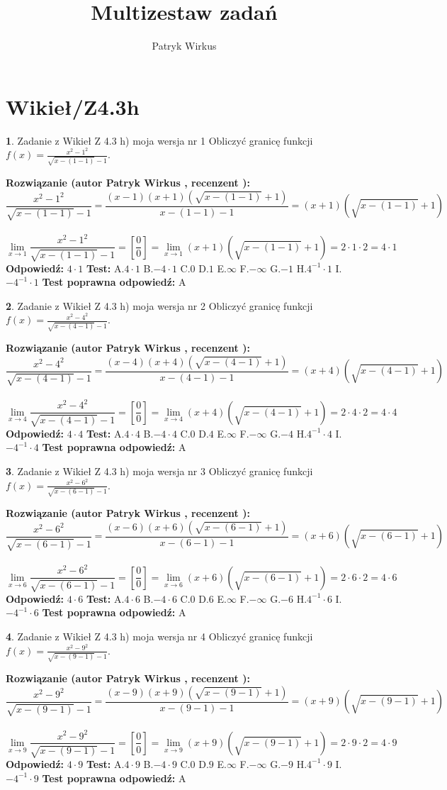 \documentclass[12pt, a4paper]{article}
\title{Multizestaw zadań}
\author{Patryk Wirkus}
\date{}
\theoremstyle{definition} %
\newtheorem{zad}{}
\newcommand{\kategoria}[1]{\section{#1}}
\newcommand{\zadStart}[1]{\begin{zad}#1\newline}
\newcommand{\zadStop}{\end{zad}}
\newcommand{\rozwStart}[2]{\noindent \textbf{Rozwiązanie (autor #1 , recenzent #2): }\newline}
\newcommand{\rozwStop}{\newline}
\newcommand{\odpStart}{\noindent \textbf{Odpowiedź:}\newline}
\newcommand{\odpStop}{\newline}
\newcommand{\testStart}{\noindent \textbf{Test:}\newline}
\newcommand{\testStop}{\newline}
\newcommand{\kluczStart}{\noindent \textbf{Test poprawna odpowiedź:}\newline}
\newcommand{\kluczStop}{\newline}
\begin{document}
\maketitle

\kategoria{Wikieł/Z4.3h}


\zadStart{Zadanie z Wikieł Z 4.3 h) moja wersja nr 1}
Obliczyć granicę funkcji $f(x)=\frac{x^{2} - 1^{2}}{\sqrt{x-(1-1)}-1}$.
\zadStop
\rozwStart{Patryk Wirkus}{}
$$\frac{x^{2} - 1^{2}}{\sqrt{x-(1-1)}-1}=\frac{(x-1)(x+1)(\sqrt{x-(1-1)}+1)}{x-(1-1)-1}=(x+1)(\sqrt{x-(1-1)}+1)$$
\\
$$\lim\limits_{x\to 1}\frac{x^{2} - 1^{2}}{\sqrt{x-(1-1)}-1}=[\frac{0}{0}]=
\lim\limits_{x\to 1}(x+1)(\sqrt{x-(1-1)}+1) = 2\cdot1 \cdot 2 = 4 \cdot 1$$
\rozwStop
\odpStart
$4\cdot1$
\odpStop
\testStart
A.$4\cdot1$
B.$-4\cdot1$
C.$0$
D.$1$
E.$\infty$
F.$-\infty$
G.$-1$
H.$4^{-1}\cdot1$
I.$-4^{-1}\cdot1$
\testStop
\kluczStart
A
\kluczStop



\zadStart{Zadanie z Wikieł Z 4.3 h) moja wersja nr 2}
Obliczyć granicę funkcji $f(x)=\frac{x^{2} - 4^{2}}{\sqrt{x-(4-1)}-1}$.
\zadStop
\rozwStart{Patryk Wirkus}{}
$$\frac{x^{2} - 4^{2}}{\sqrt{x-(4-1)}-1}=\frac{(x-4)(x+4)(\sqrt{x-(4-1)}+1)}{x-(4-1)-1}=(x+4)(\sqrt{x-(4-1)}+1)$$
\\
$$\lim\limits_{x\to 4}\frac{x^{2} - 4^{2}}{\sqrt{x-(4-1)}-1}=[\frac{0}{0}]=
\lim\limits_{x\to 4}(x+4)(\sqrt{x-(4-1)}+1) = 2\cdot4 \cdot 2 = 4 \cdot 4$$
\rozwStop
\odpStart
$4\cdot4$
\odpStop
\testStart
A.$4\cdot4$
B.$-4\cdot4$
C.$0$
D.$4$
E.$\infty$
F.$-\infty$
G.$-4$
H.$4^{-1}\cdot4$
I.$-4^{-1}\cdot4$
\testStop
\kluczStart
A
\kluczStop



\zadStart{Zadanie z Wikieł Z 4.3 h) moja wersja nr 3}
Obliczyć granicę funkcji $f(x)=\frac{x^{2} - 6^{2}}{\sqrt{x-(6-1)}-1}$.
\zadStop
\rozwStart{Patryk Wirkus}{}
$$\frac{x^{2} - 6^{2}}{\sqrt{x-(6-1)}-1}=\frac{(x-6)(x+6)(\sqrt{x-(6-1)}+1)}{x-(6-1)-1}=(x+6)(\sqrt{x-(6-1)}+1)$$
\\
$$\lim\limits_{x\to 6}\frac{x^{2} - 6^{2}}{\sqrt{x-(6-1)}-1}=[\frac{0}{0}]=
\lim\limits_{x\to 6}(x+6)(\sqrt{x-(6-1)}+1) = 2\cdot6 \cdot 2 = 4 \cdot 6$$
\rozwStop
\odpStart
$4\cdot6$
\odpStop
\testStart
A.$4\cdot6$
B.$-4\cdot6$
C.$0$
D.$6$
E.$\infty$
F.$-\infty$
G.$-6$
H.$4^{-1}\cdot6$
I.$-4^{-1}\cdot6$
\testStop
\kluczStart
A
\kluczStop



\zadStart{Zadanie z Wikieł Z 4.3 h) moja wersja nr 4}
Obliczyć granicę funkcji $f(x)=\frac{x^{2} - 9^{2}}{\sqrt{x-(9-1)}-1}$.
\zadStop
\rozwStart{Patryk Wirkus}{}
$$\frac{x^{2} - 9^{2}}{\sqrt{x-(9-1)}-1}=\frac{(x-9)(x+9)(\sqrt{x-(9-1)}+1)}{x-(9-1)-1}=(x+9)(\sqrt{x-(9-1)}+1)$$
\\
$$\lim\limits_{x\to 9}\frac{x^{2} - 9^{2}}{\sqrt{x-(9-1)}-1}=[\frac{0}{0}]=
\lim\limits_{x\to 9}(x+9)(\sqrt{x-(9-1)}+1) = 2\cdot9 \cdot 2 = 4 \cdot 9$$
\rozwStop
\odpStart
$4\cdot9$
\odpStop
\testStart
A.$4\cdot9$
B.$-4\cdot9$
C.$0$
D.$9$
E.$\infty$
F.$-\infty$
G.$-9$
H.$4^{-1}\cdot9$
I.$-4^{-1}\cdot9$
\testStop
\kluczStart
A
\kluczStop
\end{document}
